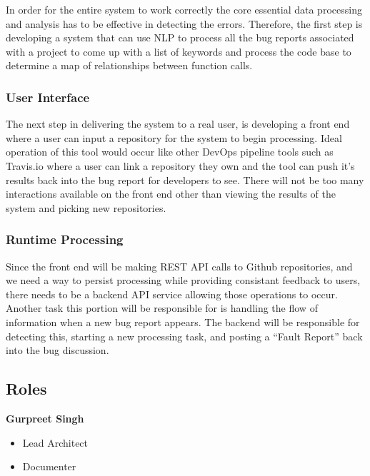 \documentclass[11pt,]{article}
\begin{document}
In order for the entire system to work correctly the core essential data
processing and analysis has to be effective in detecting the errors.
Therefore, the first step is developing a system that can use NLP to
process all the bug reports associated with a project to come up with a
list of keywords and process the code base to determine a map of
relationships between function calls.

\hypertarget{user-interface}{%
\subsubsection{User Interface}\label{user-interface}}

The next step in delivering the system to a real user, is developing a
front end where a user can input a repository for the system to begin
processing. Ideal operation of this tool would occur like other DevOps
pipeline tools such as Travis.io where a user can link a repository they
own and the tool can push it's results back into the bug report for
developers to see. There will not be too many interactions available on
the front end other than viewing the results of the system and picking
new repositories.

\hypertarget{runtime-processing}{%
\subsubsection{Runtime Processing}\label{runtime-processing}}

Since the front end will be making REST API calls to Github
repositories, and we need a way to persist processing while providing
consistant feedback to users, there needs to be a backend API service
allowing those operations to occur. Another task this portion will be
responsible for is handling the flow of information when a new bug
report appears. The backend will be responsible for detecting this,
starting a new processing task, and posting a ``Fault Report'' back into
the bug discussion.

\hypertarget{roles}{%
\subsection{Roles}\label{roles}}

\textbf{Gurpreet Singh}

\begin{itemize}
\item
  Lead Architect
\item
  Documenter
\end{itemize}
\end{document}
